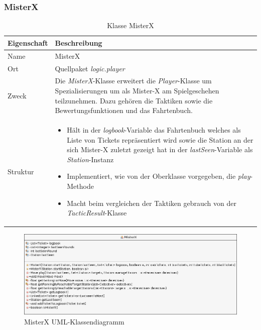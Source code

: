     \subsubsection{MisterX}
        \begin{table}[H]
            \caption{Klasse MisterX}
            \begin{tabular}{p{2.5cm}  p{9.5cm}} 
                \hline
                \textbf{Eigenschaft} & \textbf{Beschreibung}\\
                \hline
                Name & MisterX\\
                Ort & Quellpaket \textit{logic.player}\\
                \hline
                Zweck &
                Die \textit{MisterX}-Klasse erweitert die \textit{Player}-Klasse um Spezialisierungen um als Mister-X am Spielgeschehen teilzunehmen.
                Dazu gehören die Taktiken sowie die Bewertungsfunktionen und das Fahrtenbuch.
                \\
                \hline
                Struktur &
                \begin{itemize}
                    \itemsep0em
                    \item Hält in der \textit{logbook}-Variable das Fahrtenbuch welches als Liste von Tickets repräsentiert wird sowie 
                            die Station an der sich Mister-X zuletzt gezeigt hat in der \textit{lastSeen}-Variable als \textit{Station}-Instanz
                    \item Implementiert, wie von der Oberklasse vorgegeben, die \textit{play}-Methode
                    \item Macht beim vergleichen der Taktiken gebrauch von der \textit{TacticResult}-Klasse
                \end{itemize}\\
                \hline
            \end{tabular}
        \end{table}
        \begin{figure}[H]
            \centering
            \includegraphics[scale=0.35]{img/uml/misterx.png}   
            \caption{MisterX UML-Klassendiagramm}
        \end{figure}



